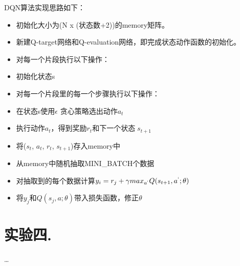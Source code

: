 \documentclass[a4paper,UTF8]{article}
\theoremstyle{definition}
\begin{document}
DQN算法实现思路如下：
\begin{itemize}
	\item 初始化大小为(N x (状态数+2))的memory矩阵。
	\item 新建Q-target网络和Q-evaluation网络，即完成状态动作函数的初始化。
	\item 对每一个片段执行以下操作：
	\item 初始化状态s
	\item 对每一个片段里的每一个步骤执行以下操作：
	\item 在状态s使用$\epsilon$ 贪心策略选出动作$a_t$
	\item 执行动作$a_t$，得到奖励$r_t$和下一个状态$s_{t+1}$
	\item 将($s_t$, $a_t$, $r_t$, $s_{t+1}$)存入memory中
	\item 从memory中随机抽取MINI\_BATCH个数据
	\item 对抽取到的每个数据计算$y_i = r_j + \gamma max_{a^`} Q(s_{t+1}, a^`; \theta)$
	\item 将$y_j$和$Q(s_j, a; \theta)$带入损失函数，修正$\theta$
\end{itemize}

\section*{实验四. }
	\dots
\end{document}
